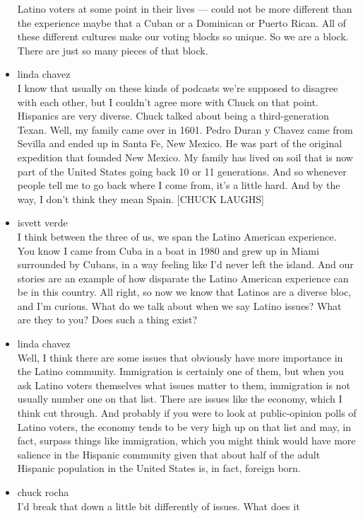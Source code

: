 \begin{itemize}
  Latino voters at some point in their lives --- could not be more
  different than the experience maybe that a Cuban or a Dominican or
  Puerto Rican. All of these different cultures make our voting blocks
  so unique. So we are a block. There are just so many pieces of that
  block.
\item
  linda chavez\\
  I know that usually on these kinds of podcasts we're supposed to
  disagree with each other, but I couldn't agree more with Chuck on that
  point. Hispanics are very diverse. Chuck talked about being a
  third-generation Texan. Well, my family came over in 1601. Pedro Duran
  y Chavez came from Sevilla and ended up in Santa Fe, New Mexico. He
  was part of the original expedition that founded New Mexico. My family
  has lived on soil that is now part of the United States going back 10
  or 11 generations. And so whenever people tell me to go back where I
  come from, it's a little hard. And by the way, I don't think they mean
  Spain. {[}CHUCK LAUGHS{]}
\item
  isvett verde\\
  I think between the three of us, we span the Latino American
  experience. You know I came from Cuba in a boat in 1980 and grew up in
  Miami surrounded by Cubans, in a way feeling like I'd never left the
  island. And our stories are an example of how disparate the Latino
  American experience can be in this country. All right, so now we know
  that Latinos are a diverse bloc, and I'm curious. What do we talk
  about when we say Latino issues? What are they to you? Does such a
  thing exist?
\item
  linda chavez\\
  Well, I think there are some issues that obviously have more
  importance in the Latino community. Immigration is certainly one of
  them, but when you ask Latino voters themselves what issues matter to
  them, immigration is not usually number one on that list. There are
  issues like the economy, which I think cut through. And probably if
  you were to look at public-opinion polls of Latino voters, the economy
  tends to be very high up on that list and may, in fact, surpass things
  like immigration, which you might think would have more salience in
  the Hispanic community given that about half of the adult Hispanic
  population in the United States is, in fact, foreign born.
\item
  chuck rocha\\
  I'd break that down a little bit differently of issues. What does it

\end{itemize}
